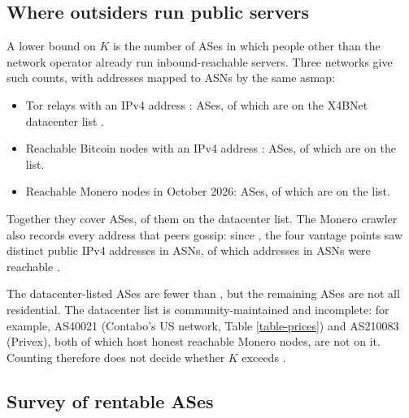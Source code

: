 \documentclass[english]{mrl}
\theoremstyle{plain}
\begin{document}
\subsection{Where outsiders run public servers}

A lower bound on $K$ is the number of ASes in which people other than the network operator already run inbound-reachable servers. Three networks give such counts, with addresses mapped to ASNs by the same asmap:
\begin{itemize}
\item Tor relays with an IPv4 address \cite{Onionoo}: \torAses{} ASes, of which \torDc{} are on the X4BNet datacenter list \cite{X4BDatacenter}.
\item Reachable Bitcoin nodes with an IPv4 address \cite{Bitnodes}: \btcAses{} ASes, of which \btcDc{} are on the list.
\item Reachable Monero nodes in October 2026: \hAsnNew{} ASes, of which \nHonestDcAsn{} are on the list.
\end{itemize}
Together they cover \unionAses{} ASes, \unionDc{} of them on the datacenter list. The Monero crawler also records every address that peers gossip: since \crawlStart, the four vantage points saw \crawlIps{} distinct public IPv4 addresses in \crawlAsns{} ASNs, of which \crawlReachIps{} addresses in \crawlReachAsns{} ASNs were reachable \cite{Observatory}.

The \unionDc{} datacenter-listed ASes are fewer than \kBreakEven, but the remaining \unionUnlisted{} ASes are not all residential. The datacenter list is community-maintained and incomplete: for example, AS40021 (Contabo's US network, Table \ref{table-prices}) and AS210083 (Privex), both of which host honest reachable Monero nodes, are not on it. Counting therefore does not decide whether $K$ exceeds \kBreakEven.

\subsection{Survey of rentable ASes}
\end{document}
